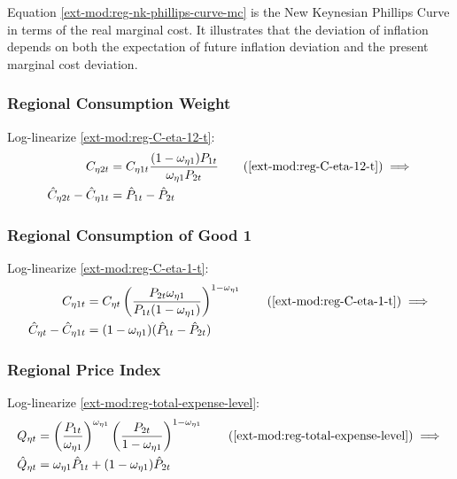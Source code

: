 \documentclass[../thesis.tex]{subfiles}
\begin{document}
Equation \ref{ext-mod:reg-nk-phillips-curve-mc} is the New Keynesian Phillips Curve in terms of the real marginal cost. It illustrates that the deviation of inflation depends on both the expectation of future inflation deviation and the present marginal cost deviation.


\subsubsection*{Regional Consumption Weight}

Log-linearize \ref{ext-mod:reg-C-eta-12-t}:
\begin{align}
	C_{\eta 2 t} &= C_{\eta 1 t} \frac{(1 - \omega_{\eta 1}) P_{1t}}{\omega_{\eta 1} P_{2t}} \tag{\ref{ext-mod:reg-C-eta-12-t}} \implies \\
	\hat{C}_{\eta 2t} - \hat{C}_{\eta 1t} &= \hat{P}_{1t} - \hat{P}_{2t} \label{ext-mod:reg-C-eta-12-t-ll}
\end{align}

\subsubsection*{Regional Consumption of Good 1}

Log-linearize \ref{ext-mod:reg-C-eta-1-t}:
\begin{align}
	C_{\eta 1 t} &= C_{\eta t} \left( \frac{P_{2t} \omega_{\eta 1}}{P_{1t} (1 - \omega_{\eta 1})} \right)^{1-\omega_{\eta 1}} \tag{\ref{ext-mod:reg-C-eta-1-t}} \implies \\
	\hat{C}_{\eta t} - \hat{C}_{\eta 1 t} &= (1 - \omega_{\eta 1}) (\hat{P}_{1t} - \hat{P}_{2t}) \label{ext-mod:reg-C-eta-1-t-ll}
\end{align}


\subsubsection*{Regional Price Index}

Log-linearize \ref{ext-mod:reg-total-expense-level}:
\begin{align}
	Q_{\eta t} &= \left( \frac{P_{1 t}}{\omega_{\eta 1}} \right)^{\omega_{\eta 1}} \left( \frac{P_{2 t}}{1 -\omega_{\eta 1}} \right)^{1 -\omega_{\eta 1}} \tag{\ref{ext-mod:reg-total-expense-level}} \implies \\
	\hat{Q}_{\eta t} &= \omega_{\eta 1} \hat{P}_{1 t} + (1 -\omega_{\eta 1}) \hat{P}_{2 t} \label{ext-mod:reg-total-expense-level-ll}
\end{align}
\end{document}
